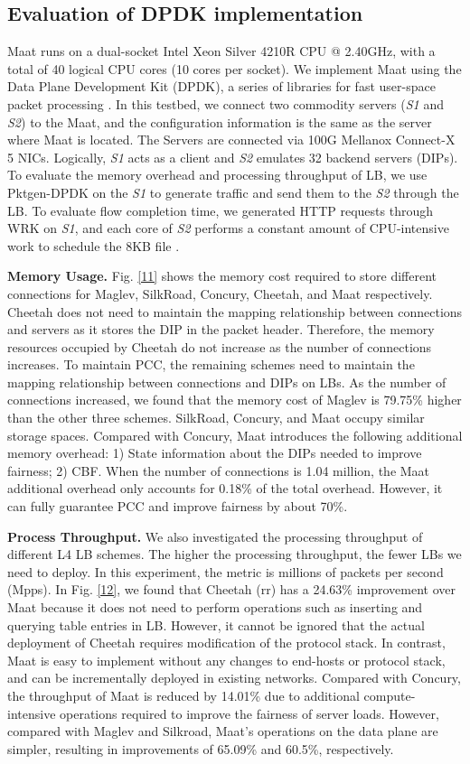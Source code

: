 \subsection{Evaluation of DPDK implementation}
Maat runs on a dual-socket Intel Xeon Silver 4210R CPU @ 2.40GHz, with a total of 40 logical CPU cores (10 cores per socket). We implement Maat using the Data Plane Development Kit (DPDK), a series of libraries for fast user-space packet processing \cite{pktgenDPDK}. In this testbed, we connect two commodity servers (\emph{S1} and \emph{S2}) to the Maat, and the configuration information is the same as the server where Maat is located. The Servers are connected via 100G Mellanox Connect-X 5 NICs. Logically, \emph{S1} acts as a client and \emph{S2} emulates 32 backend servers (DIPs). To evaluate the memory overhead and processing throughput of LB, we use Pktgen-DPDK \cite{pktgenDPDK} on the \emph{S1} to generate traffic and send them to the \emph{S2} through the LB. To evaluate flow completion time, we generated HTTP requests through WRK on \emph{S1}, and each core of \emph{S2} performs a constant amount of CPU-intensive work to schedule the 8KB file \cite{barbette2020high}.

\textbf{Memory Usage.} Fig. \ref{11} shows the memory cost required to store different connections for Maglev, SilkRoad, Concury, Cheetah, and Maat respectively. Cheetah does not need to maintain the mapping relationship between connections and servers as it stores the DIP in the packet header. Therefore, the memory resources occupied by Cheetah do not increase as the number of connections increases. To maintain PCC, the remaining schemes need to maintain the mapping relationship between connections and DIPs on LBs. As the number of connections increased, we found that the memory cost of Maglev is 79.75\% higher than the other three schemes. SilkRoad, Concury, and Maat occupy similar storage spaces. Compared with Concury, Maat introduces the following additional memory overhead: 1) State information about the DIPs needed to improve fairness; 2) CBF. When the number of connections is 1.04 million, the Maat additional overhead only accounts for 0.18\% of the total overhead. However, it can fully guarantee PCC and improve fairness by about 70\%.

\textbf{Process Throughput.} We also investigated the processing throughput of different L4 LB schemes. The higher the processing throughput, the fewer LBs we need to deploy. In this experiment, the metric is millions of packets per second (Mpps). In Fig. \ref{12}, we found that Cheetah (rr) has a 24.63\% improvement over Maat because it does not need to perform operations such as inserting and querying table entries in LB. However, it cannot be ignored that the actual deployment of Cheetah requires modification of the protocol stack. In contrast, Maat is easy to implement without any changes to end-hosts or protocol stack, and can be incrementally deployed in existing networks. Compared with Concury, the throughput of Maat is reduced by 14.01\% due to additional compute-intensive operations required to improve the fairness of server loads. However, compared with Maglev and Silkroad, Maat's operations on the data plane are simpler, resulting in improvements of 65.09\% and 60.5\%, respectively.

